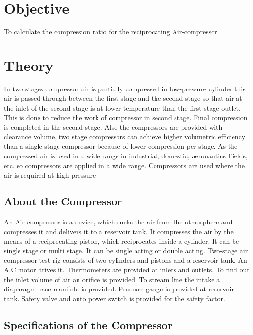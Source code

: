 \documentclass[11pt]{article}
\begin{document}
	
\tableofcontents
\thispagestyle{empty}
\clearpage


\setcounter{page}{1}

\section{Objective}
To calculate the compression ratio for the reciprocating Air-compressor



\section{Theory}

In two stages compressor air is partially compressed in low-pressure cylinder this air is
passed through between the first stage and the second stage so that air at the inlet of the second stage is
at lower temperature than the first stage outlet. This is done to reduce the work of compressor in second
stage. Final compression is completed in the second stage. Also the compressors are provided with
clearance volume, two stage compressors can achieve higher volumetric efficiency than a single stage
compressor because of lower compression per stage. As the compressed air is used in a wide range in industrial, domestic, aeronautics Fields, etc. so compressors are applied in a wide range. Compressors
are used where the air is required at high pressure



\subsection{About the Compressor}

An Air compressor is a device, which sucks the air from the atmosphere
and compresses it and delivers it to a reservoir tank. It compresses the air by the means of a
reciprocating piston, which reciprocates inside a cylinder. It can be single stage or multi stage. It can be
single acting or double acting. Two-stage air compressor test rig consists of two cylinders and pistons
and a reservoir tank. An A.C motor drives it. Thermometers are provided at inlets and outlets. To find
out the inlet volume of air an orifice is provided. To stream line the intake a diaphragm base manifold is
provided. Pressure gauge is provided at reservoir tank. Safety valve and auto power switch is provided
for the safety factor.


\subsection{Specifications of the Compressor}
\end{document}
